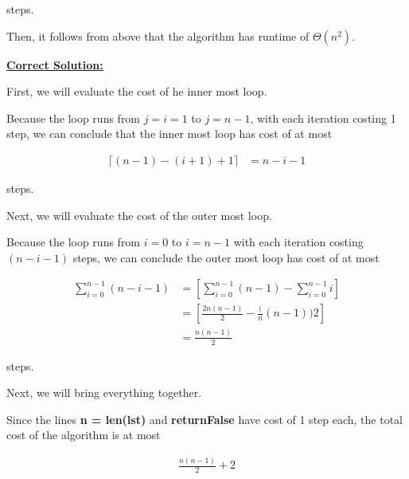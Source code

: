 \documentclass[12pt]{article}
\begin{document}
\begin{enumerate}[a.]
    steps.

    \bigskip

    Then, it follows from above that the algorithm has runtime of $\Theta(n^2)$.

    \begin{mdframed}
        \underline{\textbf{Correct Solution:}}

        \bigskip

        First, we will evaluate the cost of he inner most loop.

        \bigskip

        Because the loop runs from $j = i = 1$ to $j = n - 1$, with each iteration costing
        1 step, we can conclude that the inner most loop has cost of at most

        \begin{align}
            \lceil (n-1) - (i + 1) + 1 \rceil &= n - i - 1
        \end{align}

        steps.

        \bigskip

        Next, we will evaluate the cost of the outer most loop.

        \bigskip

        Because the loop runs from $i = 0$ to $i = n - 1$ with each iteration
        costing $(n - i - 1)$ steps, we can conclude the outer most loop has cost of
        at most

        \begin{align}
            \sum\limits_{i=0}^{n-1} (n - i - 1) &= \left[ \sum\limits_{i=0}^{n-1} (n-1) - \sum\limits_{i=0}^{n-1} i \right]\\
            &= \left[ \frac{2n(n-1)}{2} - \frac(n(n-1)){2} \right]\\
            &= \frac{n(n-1)}{2}
        \end{align}

        steps.

        \bigskip

        Next, we will bring everything together.

        \bigskip

        Since the lines \textbf{n = len(lst)} and \textbf{return\:False} have cost of 1 step each,
        the total cost of the algorithm is \color{red} at most \color{black}

        \begin{align}
            \frac{n(n-1)}{2} + 2
        \end{align}


\end{mdframed}
\end{enumerate}
\end{document}
